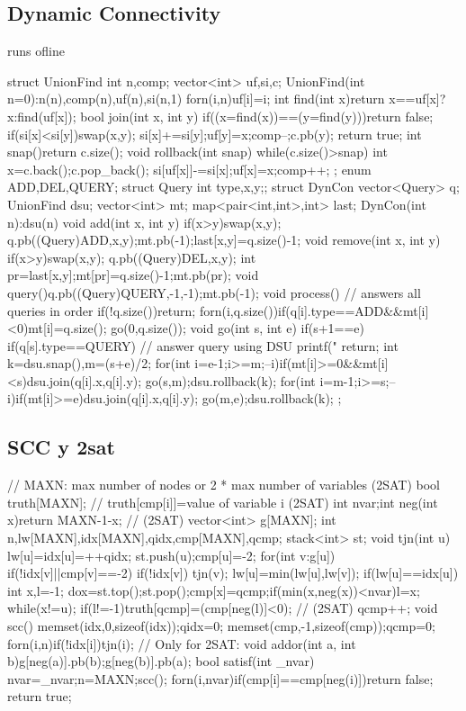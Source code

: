\documentclass[10pt, landscape, twocolumn, a4paper, notitlepage]{article}
\begin{document}
\subsection{Dynamic Connectivity}
runs ofline
\begin{code}
struct UnionFind {
	int n,comp;
	vector<int> uf,si,c;
	UnionFind(int n=0):n(n),comp(n),uf(n),si(n,1){
		forn(i,n)uf[i]=i;}
	int find(int x){return x==uf[x]?x:find(uf[x]);}
	bool join(int x, int y){
		if((x=find(x))==(y=find(y)))return false;
		if(si[x]<si[y])swap(x,y);
		si[x]+=si[y];uf[y]=x;comp--;c.pb(y);
		return true;
	}
	int snap(){return c.size();}
	void rollback(int snap){
		while(c.size()>snap){
			int x=c.back();c.pop_back();
			si[uf[x]]-=si[x];uf[x]=x;comp++;
		}
	}
};
enum {ADD,DEL,QUERY};
struct Query {int type,x,y;};
struct DynCon {
	vector<Query> q;
	UnionFind dsu;
	vector<int> mt;
	map<pair<int,int>,int> last;
	DynCon(int n):dsu(n){}
	void add(int x, int y){
		if(x>y)swap(x,y);
		q.pb((Query){ADD,x,y});mt.pb(-1);last[{x,y}]=q.size()-1;
	}
	void remove(int x, int y){
		if(x>y)swap(x,y);
		q.pb((Query){DEL,x,y});
		int pr=last[{x,y}];mt[pr]=q.size()-1;mt.pb(pr);
	}
	void query(){q.pb((Query){QUERY,-1,-1});mt.pb(-1);}
	void process(){ // answers all queries in order
		if(!q.size())return;
		forn(i,q.size())if(q[i].type==ADD&&mt[i]<0)mt[i]=q.size();
		go(0,q.size());
	}
	void go(int s, int e){
		if(s+1==e){
			if(q[s].type==QUERY) // answer query using DSU
				printf("%
			return;
		}
		int k=dsu.snap(),m=(s+e)/2;
		for(int i=e-1;i>=m;--i)if(mt[i]>=0&&mt[i]<s)dsu.join(q[i].x,q[i].y);
		go(s,m);dsu.rollback(k);
		for(int i=m-1;i>=s;--i)if(mt[i]>=e)dsu.join(q[i].x,q[i].y);
		go(m,e);dsu.rollback(k);
	}
};
\end{code}
\subsection{SCC y 2sat}
\begin{code}
// MAXN: max number of nodes or 2 * max number of variables (2SAT)
bool truth[MAXN]; // truth[cmp[i]]=value of variable i (2SAT)
int nvar;int neg(int x){return MAXN-1-x;} // (2SAT)
vector<int> g[MAXN];
int n,lw[MAXN],idx[MAXN],qidx,cmp[MAXN],qcmp;
stack<int> st;
void tjn(int u){
	lw[u]=idx[u]=++qidx;
	st.push(u);cmp[u]=-2;
	for(int v:g[u]){
		if(!idx[v]||cmp[v]==-2){
			if(!idx[v]) tjn(v);
			lw[u]=min(lw[u],lw[v]);
		}
	}
	if(lw[u]==idx[u]){
		int x,l=-1;
		do{x=st.top();st.pop();cmp[x]=qcmp;if(min(x,neg(x))<nvar)l=x;}
		while(x!=u);
		if(l!=-1)truth[qcmp]=(cmp[neg(l)]<0); // (2SAT)
		qcmp++;
	}
}
void scc(){
	memset(idx,0,sizeof(idx));qidx=0;
	memset(cmp,-1,sizeof(cmp));qcmp=0;
	forn(i,n)if(!idx[i])tjn(i);
}
// Only for 2SAT:
void addor(int a, int b){g[neg(a)].pb(b);g[neg(b)].pb(a);}
bool satisf(int _nvar){
	nvar=_nvar;n=MAXN;scc();
	forn(i,nvar)if(cmp[i]==cmp[neg(i)])return false;
	return true;
}
\end{code}
\end{document}
